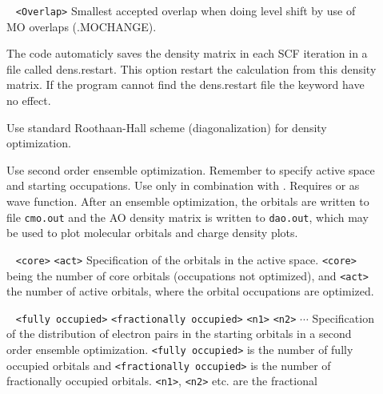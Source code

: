 \begin{description}
\item[] \verb| | \newline
\verb|<Overlap>|\newline
Smallest accepted overlap when doing level shift by use of MO overlaps (.MOCHANGE).
\item[] The code automaticly saves the density matrix in each SCF iteration in a file called dens.restart. This option restart the calculation from this density matrix. If the program cannot find the dens.restart file the keyword have no effect. 
\item[] Use standard Roothaan-Hall scheme (diagonalization) for density optimization.
\item[]
Use second order ensemble optimization. Remember to specify active space and starting occupations. Use only in combination with . 
Requires  or  as wave function. After an ensemble optimization, the orbitals are written to file \verb|cmo.out| and the AO 
density matrix is written to \verb|dao.out|, which may be used to plot molecular orbitals and charge density plots.
\item[] \verb| | \newline
\verb|<core>| \verb|<act>|\newline
Specification of the orbitals in the active space. \verb|<core>| being the number of core orbitals (occupations not optimized), and \verb|<act>| the number 
of active orbitals, where the orbital occupations are optimized.
\item[] \verb| | \newline
\verb|<fully occupied>|\newline 
\verb|<fractionally occupied>|\newline
\verb|<n1>| \verb|<n2>| $\cdots$ \newline
Specification of the distribution of electron pairs in the starting orbitals in a second order ensemble optimization. \verb|<fully occupied>| is the number of 
fully occupied orbitals and \verb|<fractionally occupied>| is the number of fractionally occupied orbitals. \verb|<n1>|, \verb|<n2>| etc. are the fractional 

\end{description}
